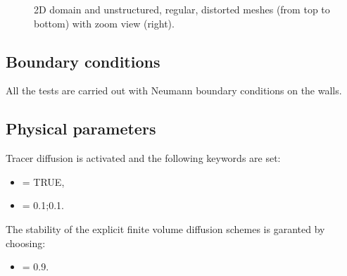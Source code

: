 \begin{figure}[h!]
\begin{minipage}[t]{0.5\textwidth}
 \centering
\end{minipage}%
\begin{minipage}[t]{0.5\textwidth}
 \centering
\end{minipage}
\begin{minipage}[t]{0.5\textwidth}
 \centering
\end{minipage}%
\begin{minipage}[t]{0.5\textwidth}
 \centering
\end{minipage}
\begin{minipage}[t]{0.5\textwidth}
 \centering
\end{minipage}%
\begin{minipage}[t]{0.5\textwidth}
 \centering
\end{minipage}
  \caption{2D domain and unstructured, regular, distorted meshes (from top to bottom) with zoom view (right).}
  \label{fig:cone_diffusion:meshes}
\end{figure}

\subsection{Boundary conditions}

All the tests are carried out with Neumann boundary conditions on the walls.

\subsection{Physical parameters}

Tracer diffusion is activated and the following keywords are set:
\begin{itemize}
\item{} = TRUE,
\item{} = 0.1;0.1.
\end{itemize}
The stability of the explicit finite volume diffusion schemes is garanted by
choosing:
\begin{itemize}
\item{} = 0.9.
\end{itemize}

